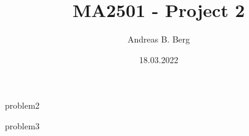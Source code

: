 \documentclass{article}
\begin{document}
\mainmatter

\title{MA2501 - Project 2}
\author{Andreas B. Berg}
\date{18.03.2022}
\maketitle
\thispagestyle{fancy}

{problem2}

\pagebreak
{problem3}


\end{document}

